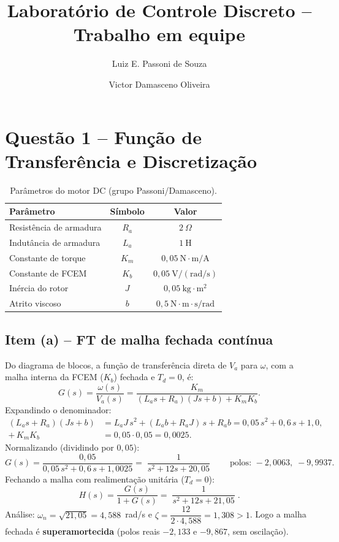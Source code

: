 \documentclass[11pt,a4paper]{article}
\title{Laborat\'orio de Controle Discreto -- Trabalho em equipe}
\author{Luiz E. Passoni de Souza \and Victor Damasceno Oliveira}
\date{}
\begin{document}
\maketitle

\section{Quest\~ao 1 -- Fun\c{c}\~ao de Transfer\^encia e Discretiza\c{c}\~ao}

\begin{table}[h]
\centering
\caption{Par\^ametros do motor DC (grupo Passoni/Damasceno).}
\begin{tabular}{lcc}
\toprule
Par\^ametro & S\'imbolo & Valor \\
\midrule
Resist\^encia de armadura & $R_a$ & $2~\Omega$ \\
Indut\^ancia de armadura  & $L_a$ & $1~\mathrm{H}$ \\
Constante de torque       & $K_m$ & $0{,}05~\mathrm{N\cdot m/A}$ \\
Constante de FCEM         & $K_b$ & $0{,}05~\mathrm{V/(rad/s)}$ \\
In\'ercia do rotor        & $J$   & $0{,}05~\mathrm{kg\cdot m^2}$ \\
Atrito viscoso            & $b$   & $0{,}5~\mathrm{N\cdot m\cdot s/rad}$ \\
\bottomrule
\end{tabular}
\end{table}

\subsection{Item (a) -- FT de malha fechada cont\'inua}

Do diagrama de blocos, a fun\c{c}\~ao de transfer\^encia direta de $V_a$ para $\omega$,
com a malha interna da FCEM ($K_b$) fechada e $T_d = 0$, \'e:
\begin{equation}
G(s)=\frac{\omega(s)}{V_a(s)}=\frac{K_m}{(L_a s+R_a)(Js+b)+K_mK_b}.
\end{equation}
Expandindo o denominador:
\begin{align}
(L_a s+R_a)(Js+b) &= L_aJ\,s^2+(L_ab+R_aJ)\,s+R_ab = 0{,}05\,s^2+0{,}6\,s+1{,}0,\\
+\,K_mK_b &= 0{,}05\cdot 0{,}05 = 0{,}0025 .
\end{align}
Normalizando (dividindo por $0{,}05$):
\begin{equation}
G(s)=\frac{0{,}05}{0{,}05\,s^2+0{,}6\,s+1{,}0025}
     =\boxed{\;\dfrac{1}{s^2+12s+20{,}05}\;}
\qquad \text{polos: } -2{,}0063,\; -9{,}9937 .
\end{equation}
Fechando a malha com realimenta\c{c}\~ao unit\'aria ($T_d=0$):
\begin{equation}
H(s)=\frac{G(s)}{1+G(s)}=\boxed{\;\dfrac{1}{s^2+12s+21{,}05}\;}.
\end{equation}
An\'alise: $\omega_n=\sqrt{21{,}05}=4{,}588$~rad/s e
$\zeta=\dfrac{12}{2\cdot 4{,}588}=1{,}308>1$. Logo a malha fechada \'e
\textbf{superamortecida} (polos reais $-2{,}133$ e $-9{,}867$, sem oscila\c{c}\~ao).
\end{document}
